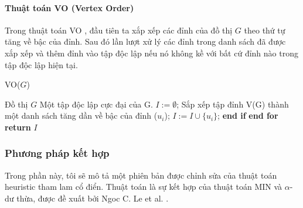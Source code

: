 \documentclass[14pt, oneside, a4paper, openany]{scrartcl}
\begin{document}
\paragraph{Thuật toán VO (Vertex Order)}
Trong thuật toán VO  \cite{VOAlgorithm}, đầu tiên ta xắp xếp các đỉnh của đồ thị $G$ theo thứ tự tăng về bậc của đỉnh. Sau đó lần lượt xử lý các đỉnh trong danh sách đã được xắp xếp và thêm đỉnh vào tập độc lập nếu nó không kề với bất cứ đỉnh nào trong tập độc lập hiện tại.

\begin{algorithm}
	\caption{VO($G$)}\label{VO}
	\begin{algorithmic}[1]
		\INPUT Đồ thị $G$
		\OUTPUT Một tập độc lập cực đại của G.
		\State $I := \emptyset$;
		\State Sắp xếp tập đỉnh V(G) thành một danh sách tăng dần về bậc của đỉnh ($u_i$);
				\State $I:= I \cup \{u_i\}$;
			\EndIf
			\State \textbf{end if}					
		\EndFor
		\State \textbf{end for}
		\State \textbf{return} $I$
	\end{algorithmic}
\end{algorithm}


\subsubsection{Phương pháp kết hợp}
Trong phần này, tôi sẽ mô tả một phiên bản được chỉnh sửa của thuật toán heuristic tham lam cổ điển. Thuật toán là sự kết hợp của thuật toán MIN và 
$\alpha$-dư thừa, được đề xuất bởi Ngoc C. Le et al. \cite{MIS}.
\end{document}
